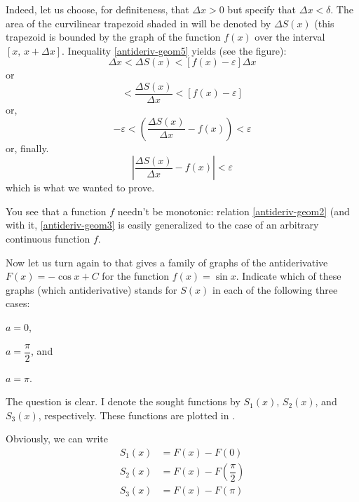 Indeed, let us choose, for definiteness, that $\Delta x > 0$ but specify that $\Delta x < \delta$. The area of the curvilinear trapezoid shaded in  will be denoted by $\Delta S (x)$ (this trapezoid is bounded by the graph of the function $f (x)$ over the interval $[x, \, x + \Delta x]$. Inequality \eqref{antideriv-geom5} yields (see the figure):
\begin{equation*}%
[f(x)  -   \varepsilon] \Delta x < \Delta S (x) < [f(x) - \varepsilon] \Delta x
\end{equation*}
or
\begin{equation*}%
[f(x)  -   \varepsilon]  < \dfrac{\Delta S (x)}{\Delta x} < [f(x) - \varepsilon]
\end{equation*}
or, 
\begin{equation*}%
 -  \varepsilon < \left( \dfrac{\Delta S (x)}{\Delta x} - f(x) \right)  < \varepsilon 
\end{equation*}
or, finally.
\begin{equation*}%
\left| \dfrac{\Delta S (x)}{\Delta x} - f(x) \right|  < \varepsilon
\end{equation*}
which is what we wanted to prove.

You see that a function $f$ needn't be monotonic: relation \eqref{antideriv-geom2} (and with it, \eqref{antideriv-geom3} is easily generalized to the case of an arbitrary continuous function $f$.

Now let us turn again to  that gives a family of graphs of the antiderivative $F (x) = - \cos x + C$ for the function $f (x) = \sin x$. Indicate which of these graphs (which antiderivative) stands for $S (x)$ in each of the following three cases: 
\begin{enumerate*}[label=(\alph*)]
\item $a = 0$, 
\item $a = \dfrac{\pi}{2}$, and 
\item $a = \pi$. 
\end{enumerate*}

\rdr The question is clear. I denote the sought functions	by	$S_{1} (x), \, S_{2}	(x)$, and $ S_{3} (x)$, respectively.	These functions are plotted in .

Obviously, we can write
\begin{align*}%
S_{1}(x) & = F(x) - F(0) \\
S_{2}(x) & = F(x) - F(\dfrac{\pi}{2})\\
S_{3}(x) &= F(x) - F(\pi)
\end{align*}

